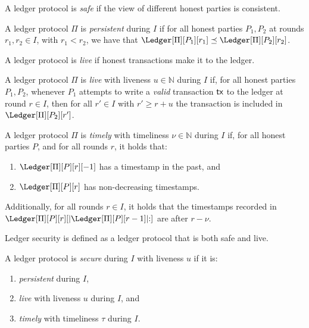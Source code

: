 A ledger protocol is \emph{safe} if the view of different honest parties is consistent.

\begin{definition}[Persistence]
  A ledger protocol $\Pi$ is \emph{persistent} during $I$ if for all honest parties $P_1, P_2$ at rounds
  $r_1, r_2 \in I$, with $r_1 < r_2$,
  we have that $\Ledger[\Pi][P_1][r_1] \preceq \Ledger[\Pi][P_2][r_2]$.
\end{definition}

A ledger protocol is \emph{live} if honest transactions make it to the ledger.

\begin{definition}[Liveness]
  A ledger protocol $\Pi$ is \emph{live} with liveness $u \in \mathbb{N}$ during $I$ if,
  for all honest parties $P_1, P_2$, whenever
  $P_1$ attempts to write a \emph{valid} transaction $\textsf{tx}$ to the ledger at round $r \in I$,
  then for all $r' \in I$ with $r' \geq r + u$
  the transaction is included in $\Ledger[\Pi][P_2][r']$.
\end{definition}

\begin{definition}[Timeliness]
  A ledger protocol $\Pi$ is \emph{timely} with timeliness $\nu \in \mathbb{N}$ during $I$ if,
  for all honest parties $P$, and for all rounds $r$, it holds that:

  \begin{enumerate}
    \item $\Ledger[\Pi][P][r][-1]$ has a timestamp in the past, and
    \item $\Ledger[\Pi][P][r]$ has non-decreasing timestamps.
  \end{enumerate}

  Additionally, for all rounds $r \in I$, it holds that
  the timestamps recorded in $\Ledger[\Pi][P][r][|\Ledger[\Pi][P][r-1]|{:}]$
  are after $r - \nu$.
\end{definition}

Ledger security is defined as a ledger protocol that is both safe and live.

\begin{definition}[Security]
  A ledger protocol is \emph{secure} during $I$ with liveness $u$ if it is:

  \begin{enumerate}
    \item \emph{persistent} during $I$,
    \item \emph{live} with liveness $u$ during $I$, and
    \item \emph{timely} with timeliness $\tau$ during $I$.
  \end{enumerate}
\end{definition}

